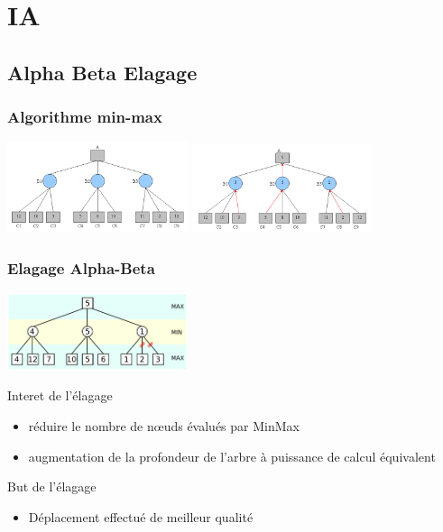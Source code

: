 \documentclass[11pt]{beamer}
\begin{document}
\section{IA}
\subsection{Alpha Beta Elagage} 
  \begin{frame}
  \frametitle{Algorithme min-max}
\includegraphics[width=150pt]{images/minmax.png}
\includegraphics[width=150pt]{images/minmax2.png}
  \end{frame}
  \begin{frame}
  \frametitle{Elagage Alpha-Beta}
\centering \includegraphics[width=150pt]{images/alphabeta.png}
\begin{block}{Interet de l'élagage}
            \begin{itemize}
                \item  réduire le nombre de nœuds évalués par MinMax
                \item augmentation de la profondeur de l'arbre à puissance de calcul équivalent
            \end{itemize}
\end{block}

\begin{alertblock}{But de l'élagage}
            \begin{itemize}
                \item Déplacement effectué de meilleur qualité
            \end{itemize}
\end{alertblock}



  \end{frame}  
  
\end{document}

